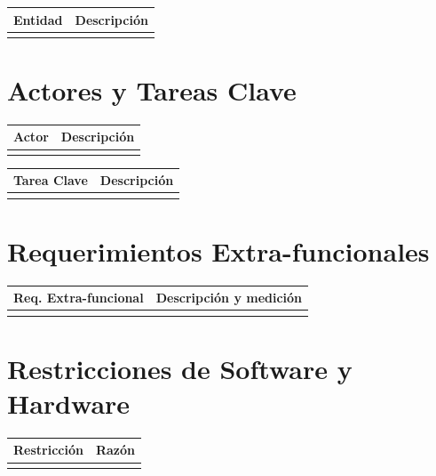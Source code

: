 \documentclass[letterpaper,12pt]{article} %
\numberwithin{equation}{section} %
\numberwithin{figure}{section} %
\numberwithin{table}{section} %
\begin{document}
\begin{table}[hb!]
  \begin{tabular}{lp{7cm}}\hline
    Entidad & Descripci\'on \\ \hline \hline %
    & \\ \hline
  \end{tabular}
\end{table}

\newpage
\section{Actores y Tareas Clave}

\begin{table}[hb!]
  \begin{tabular}{lp{7cm}}\hline
    Actor & Descripci\'on \\ \hline \hline %
    & \\ \hline    
  \end{tabular}
\end{table}

\begin{table}[hb!]
  \begin{tabular}{lp{7cm}}\hline
    Tarea Clave & Descripci\'on \\ \hline\hline %
    & \\ \hline
  \end{tabular}
\end{table}

\newpage
\section{Requerimientos Extra-funcionales}

\begin{table}[hb!]
  \begin{tabular}{lp{7cm}}\hline 
    Req. Extra-funcional & Descripci\'on y medici\'on \\ \hline\hline %
    & \\ \hline
  \end{tabular}
\end{table}

\newpage
\section{Restricciones de Software y Hardware}

\begin{table}[hb!]
  \begin{tabular}{lp{7cm}}\hline
    Restricci\'on & Raz\'on \\ \hline\hline %
    & \\ \hline
  \end{tabular}
\end{table}
\end{document}
